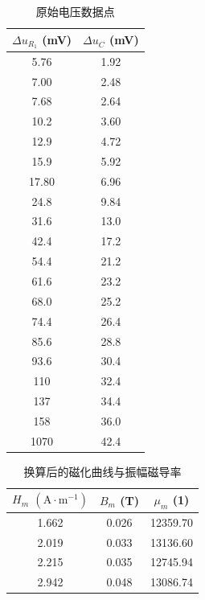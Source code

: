 \documentclass[UTF8]{article}
\theoremstyle{MyLineTheoremStyle} %
\theoremstyle{MyBlockTheoremStyle} %
\theoremstyle{MySubsubsectionStyle} %
\begin{document}
\newpage
\begin{center}
\noindent\begin{minipage}{0.25\columnwidth}
\begin{table}[H]\centering
        \caption{原始电压数据点}
        \label{1.2电压}
    \begin{tabular}{cc}\toprule
$\Delta u_{R_1}$ (mV) & $\Delta u_{C}$ (mV) \\
\midrule
5.76	& 1.92 \\
7.00	& 2.48 \\
7.68	& 2.64 \\
10.2	& 3.60 \\
12.9	& 4.72 \\
15.9	& 5.92 \\
17.80	& 6.96 \\
24.8	& 9.84 \\
31.6	& 13.0 \\
42.4	& 17.2 \\
54.4	& 21.2 \\
61.6	& 23.2 \\
68.0	& 25.2 \\
74.4	& 26.4 \\
85.6	& 28.8 \\
93.6	& 30.4 \\
110	    & 32.4 \\
137	    & 34.4 \\
158	    & 36.0 \\
1070	& 42.4 \\
\bottomrule
    \end{tabular}
\end{table}
\end{minipage}\begin{minipage}{0.4\columnwidth}
\begin{table}[H]\centering
    \caption{换算后的磁化曲线与振幅磁导率}
    \label{1.2换算后}
    \begin{tabular}{ccc}\toprule
$H_m$ $\mathrm{(A\cdot m^{-1})}$ & $B_m$ (T) & $\mu_m$ (1) \\
\midrule
1.662	& 0.026 & 12359.70 \\
2.019	& 0.033 & 13136.60 \\
2.215	& 0.035 & 12745.94 \\
2.942	& 0.048 & 13086.74 \\

\end{tabular}
\end{table}
\end{minipage}
\end{center}
\end{document}
